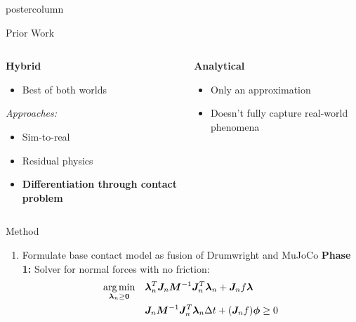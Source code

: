 \documentclass[final,hyperref={pdfpagelabels=false},5pt]{beamer}
\DeclareMathOperator*{\argmin}{arg\,min}
\begin{document}
\begin{frame}
\begin{columns}
\begin{column}{.49\textwidth}
\begin{beamercolorbox}[center,wd=\textwidth]{postercolumn}
\begin{minipage}[T]{.95\textwidth}
{\begin{block}{Prior Work}
\begin{columns}[t]
                    \begin{column}{0.3\textwidth}
                        \textbf{Hybrid}
                        \begin{itemize}
                            \item Best of both worlds
                        \end{itemize}
                        \begin{center}
                            \textit{Approaches:}
                        \end{center}
                        \begin{itemize}
                            \item Sim-to-real
                            \item Residual physics
                            \item \textbf{Differentiation through contact problem}
                        \end{itemize}
                    \end{column}

                    \begin{column}{0.3\textwidth}
                        \textbf{Analytical}
                        \begin{itemize}
                            \item Only an approximation
                            \item Doesn't fully capture real-world phenomena
                        \end{itemize}
                    \end{column}
                \end{columns}
            \end{block}
            

            \begin{block}{Method}
              \begin{enumerate}
                  \item Formulate base contact model as fusion of Drumwright \cite{Drumwrighta} and MuJoCo \cite{Todorov}
                      \textbf{Phase 1:} Solver for normal forces with no friction:
                      \begin{align*}
                          \argmin _{\NormalForce \geq \vect 0} \quad &\NormalForce^T \Jn \Mass^{-1} \Jn ^T \NormalForce + \Jn f \Force \\
                                                            & \Jn \Mass^{-1} \Jn ^T \NormalForce \Delta t + (\Jn f) \Gap \geq 0
                      \end{align*}


\end{enumerate}
\end{block}}
\end{minipage}
\end{beamercolorbox}
\end{column}
\end{columns}
\end{frame}
\end{document}
